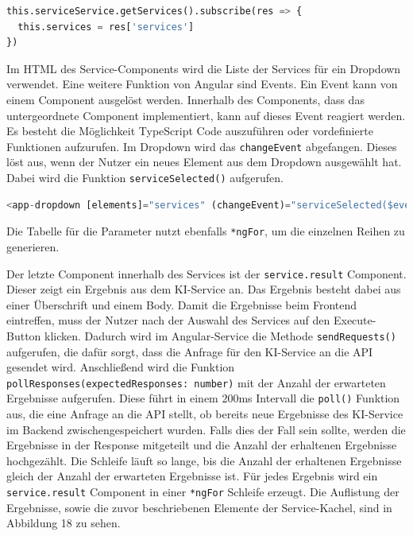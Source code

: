 \begin{lstlisting}[language=Python, caption={Subscriben auf einen Observable}]
this.serviceService.getServices().subscribe(res => {
  this.services = res['services']
})
\end{lstlisting}

Im HTML des Service-Components wird die Liste der Services für ein Dropdown verwendet. Eine weitere Funktion von Angular sind Events. Ein Event kann von einem Component ausgelöst werden. Innerhalb des Components, dass das untergeordnete Component implementiert, kann auf dieses Event reagiert werden. Es besteht die Möglichkeit TypeScript Code auszuführen oder vordefinierte Funktionen aufzurufen. Im Dropdown wird das \texttt{changeEvent} abgefangen. Dieses löst aus, wenn der Nutzer ein neues Element aus dem Dropdown ausgewählt hat. Dabei wird die Funktion \texttt{serviceSelected()} aufgerufen.

\begin{lstlisting}[language=Python, caption={Dropdown zur Auswahl der Services}]
<app-dropdown [elements]="services" (changeEvent)="serviceSelected($event)"></app-dropdown>
\end{lstlisting}

Die Tabelle für die Parameter nutzt ebenfalls \texttt{*ngFor}, um die einzelnen Reihen zu generieren. 

Der letzte Component innerhalb des Services ist der \texttt{service.result} Component. Dieser zeigt ein Ergebnis aus dem KI-Service an. Das Ergebnis besteht dabei aus einer Überschrift und einem Body. Damit die Ergebnisse beim Frontend eintreffen, muss der Nutzer nach der Auswahl des Services auf den Execute-Button klicken. Dadurch wird im Angular-Service die Methode \texttt{sendRequests()} aufgerufen, die dafür sorgt, dass die Anfrage für den KI-Service an die API gesendet wird. Anschließend wird die Funktion \texttt{pollResponses(expectedResponses: number)} mit der Anzahl der erwarteten Ergebnisse aufgerufen. Diese führt in einem 200ms Intervall die \texttt{poll()} Funktion aus, die eine Anfrage an die API stellt, ob bereits neue Ergebnisse des KI-Service im Backend zwischengespeichert wurden. Falls dies der Fall sein sollte, werden die Ergebnisse in der Response mitgeteilt und die Anzahl der erhaltenen Ergebnisse hochgezählt. Die Schleife läuft so lange, bis die Anzahl der erhaltenen Ergebnisse gleich der Anzahl der erwarteten Ergebnisse ist. Für jedes Ergebnis wird ein \texttt{service.result} Component in einer \texttt{*ngFor} Schleife erzeugt. Die Auflistung der Ergebnisse, sowie die zuvor beschriebenen Elemente der Service-Kachel, sind in Abbildung 18 zu sehen. 

